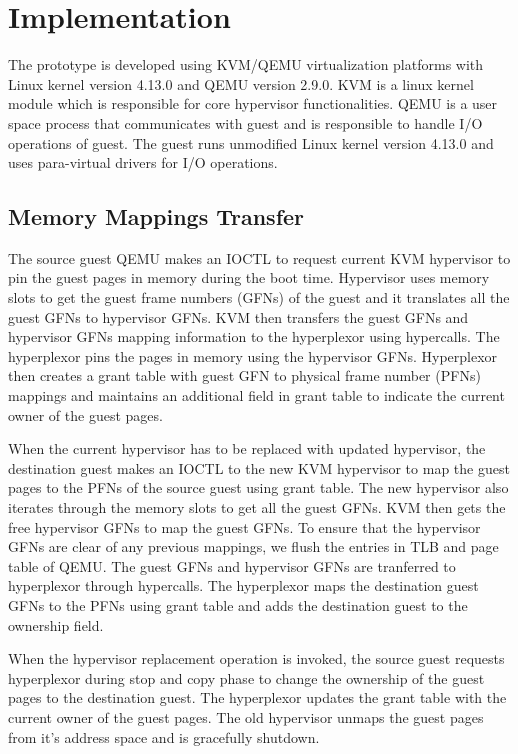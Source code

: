 \section{Implementation}
The prototype is developed using KVM/QEMU virtualization platforms with Linux kernel version 4.13.0 and QEMU version 2.9.0. KVM is a linux kernel module which is responsible for core hypervisor functionalities. QEMU is a user space process that communicates with guest and is responsible to handle I/O operations of guest. The guest runs unmodified Linux kernel version 4.13.0 and uses para-virtual drivers for I/O operations.

\subsection{Memory Mappings Transfer}
The source guest QEMU makes an IOCTL to request current KVM hypervisor to pin the guest pages in memory during the boot time. Hypervisor uses memory slots to get the guest frame numbers (GFNs) of the guest and it translates all the guest GFNs to hypervisor GFNs. KVM then transfers the guest GFNs and hypervisor GFNs mapping information to the hyperplexor using hypercalls. The hyperplexor pins the pages in memory using the hypervisor GFNs. Hyperplexor then creates a grant table with guest GFN to physical frame number (PFNs) mappings and maintains an additional field in grant table to indicate the current owner of the guest pages. 

When the current hypervisor has to be replaced with updated hypervisor, the destination guest makes an IOCTL to the new KVM hypervisor to map the guest pages to the PFNs of the source guest using grant table. The new hypervisor also iterates through the memory slots to get all the guest GFNs. KVM then gets the free hypervisor GFNs to map the guest GFNs. To ensure that the hypervisor GFNs are clear of any previous mappings, we flush the entries in TLB and page table of QEMU. The guest GFNs and hypervisor GFNs are tranferred to hyperplexor through hypercalls. The hyperplexor maps the destination guest GFNs to the PFNs using grant table and adds the destination guest to the ownership field.

When the hypervisor replacement operation is invoked, the source guest requests hyperplexor during stop and copy phase to change the ownership of the guest pages to the destination guest. The hyperplexor updates the grant table with the current owner of the guest pages. The old hypervisor unmaps the guest pages from it's address space and is gracefully shutdown. 

